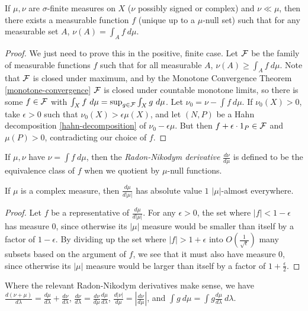 \begin{thm}\label{radon-nikodym} If $\mu, \nu$ are $\sigma$-finite measures on $X$ ($\nu$ possibly signed or complex) and $\nu \ll \mu$, then there exists a measurable function $f$ (unique up to a $\mu$-null set) such that for any measurable set $A$, $\nu(A) = \int_A f\ d\mu$.
\end{thm}
\begin{proof} We just need to prove this in the positive, finite case. Let $\mathcal{F}$ be the family of measurable functions $f$ such that for all measurable $A$, $\nu(A) \ge \int_A f\ d\mu$. Note that $\mathcal{F}$ is closed under maximum, and by the Monotone Convergence Theorem \ref{monotone-convergence} $\mathcal{F}$ is closed under countable monotone limits, so there is some $f \in \mathcal{F}$ with $\int_X f\ d\mu = \sup_{g \in \mathcal{F}} \int_X g\ d\mu$. Let $\nu_0 = \nu - \int f\ d\mu$. If $\nu_0(X) > 0$, take $\epsilon > 0$ such that $\nu_0(X) > \epsilon \mu(X)$, and let $(N,P)$ be a Hahn decomposition \ref{hahn-decomposition} of $\nu_0 - \epsilon \mu$. But then $f + \epsilon\cdot 1_P \in \mathcal{F}$ and $\mu(P) > 0$, contradicting our choice of $f$.
\end{proof}

\begin{defn} If $\mu, \nu$ have $\nu = \int f\ d\mu$, then the \emph{Radon-Nikodym derivative} $\frac{d\nu}{d\mu}$ is defined to be the equivalence class of $f$ when we quotient by $\mu$-null functions.
\end{defn}

\begin{prop} If $\mu$ is a complex measure, then $\frac{d\mu}{d|\mu|}$ has absolute value $1$ $|\mu|$-almost everywhere.
\end{prop}
\begin{proof} Let $f$ be a representative of $\frac{d\mu}{d|\mu|}$. For any $\epsilon > 0$, the set where $|f| < 1-\epsilon$ has measure $0$, since otherwise its $|\mu|$ measure would be smaller than itself by a factor of $1-\epsilon$. By dividing up the set where $|f| > 1+\epsilon$ into $O(\tfrac{1}{\sqrt{\epsilon}})$ many subsets based on the argument of $f$, we see that it must also have measure $0$, since otherwise its $|\mu|$ measure would be larger than itself by a factor of $1 + \frac{\epsilon}{2}$.
\end{proof}

\begin{prop} Where the relevant Radon-Nikodym derivatives make sense, we have $\frac{d(\nu+\mu)}{d\lambda} = \frac{d\mu}{d\lambda} + \frac{d\nu}{d\lambda}$, $\frac{d\nu}{d\lambda} = \frac{d\nu}{d\mu} \frac{d\mu}{d\lambda}$, $\frac{d|\nu|}{d\mu} = |\frac{d\nu}{d\mu}|$, and $\int g\ d\mu = \int g\frac{d\mu}{d\lambda}\ d\lambda$.
\end{prop}

